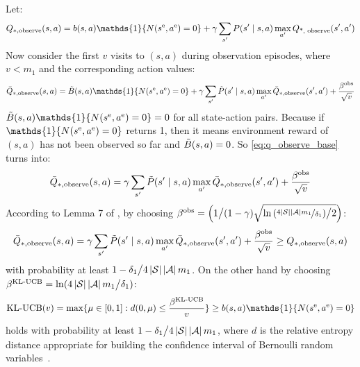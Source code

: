 Let:
%
\begin{equation*}
    Q_{*, \text{observe}}(s, a) = b(s, a)\mathds{1}\{N(\env{s}, \env{a}) = 0\} + \gamma \sum_{s'}P(s' \mid s, a)\max_{a'}Q_{\text{*, \text{observe}}}(s', a')
\end{equation*}
%
Now consider the first $v$ visits to $(s, a)$ during observation episodes, where $v < m_1$ and the corresponding action values:
%
\begin{equation}
    \label{eq:q_observe_base}
    \model{Q}_{*, \text{observe}}(s, a) = \estimate{B}(s, a)\mathds{1}\{N(\env{s}, \env{a}) = 0\} + \gamma \sum_{s'}\estimate{P}(s' \mid s, a)\max_{a'}\model{Q}_{*, \text{observe}}(s', a') + \frac{\beta^{\text{obs}}}{\sqrt{v}}
\end{equation}
%
$\estimate{B}(s, a)\mathds{1}\{N(\env{s}, \env{a}) = 0\} = 0$ for all state-action pairs. Because if $\mathds{1}\{N(\env{s}, \env{a}) = 0\}$ returns 1, then it means environment reward of $(s, a)$ has not been observed so far and $\tilde{B}(s, a) = 0$. So \cref{eq:q_observe_base} turns into:
%
\begin{equation}
\bar{Q}_{*, \text{observe}}(s, a) = \gamma \sum_{s'}\tilde{P}(s' \mid s, a)\max_{a'}\bar{Q}_{*, \text{observe}}(s', a') + \frac{\beta^{\text{obs}}}{\sqrt{v}}\end{equation}
%
According to Lemma 7 of \citet{strehl2008analysis}, by choosing $\beta^{\text{obs}} = \left({1}\big/{(1 - \gamma)} \sqrt{\ln{\left( \nicefrac{4\left \lvert \mathcal{S} \right \rvert\left \lvert \mathcal{A} \right \rvert m_1}{\delta_1}\right)}\big/{2}}\right)$:
%
\begin{align*}
     \bar{Q}_{*, \text{observe}}(s, a) = \gamma \sum_{s'}\tilde{P}(s' \mid s, a)\max_{a'}\bar{Q}_{*, \text{observe}}(s', a') + \frac{\beta^{\text{obs}}}{\sqrt{v}} \geq Q_{*, \text{observe}}(s, a)
\end{align*}
% 
with probability at least $1 - {\delta_1} \big/ {4\left \lvert \mathcal{S} \right \rvert\left \lvert \mathcal{A} \right \rvert m_1}$. On the other hand by choosing $\beta^{\text{KL-UCB}} = \ln(4\left \lvert \mathcal{S} \right \rvert\left \lvert \mathcal{A} \right \rvert m_1 \big/ \delta_1)$:
%
\begin{equation*}
    \text{KL-UCB}(v) =  \max \{\mu \in [0, 1]: d(0, \mu) \leq \frac{\beta^{\text{KL-UCB}}}{v}\} \geq b(s, a)\mathds{1}\{N(\env{s}, \env{a}) = 0\}
\end{equation*}
%
holds with probability at least $1 - {\delta_1} \big/ {4\left \lvert \mathcal{S} \right \rvert\left \lvert \mathcal{A} \right \rvert m_1}$, where $d$ is the relative entropy distance appropriate for building the confidence interval of Bernoulli random variables~\citep{lattimore2020bandit, garivier2011kl, maillard2011finite}.

